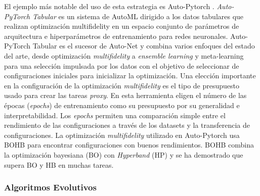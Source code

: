 El ejemplo más notable del uso de esta estrategia es Auto-Pytorch \cite{zimmer2021auto}. \textit{Auto-PyTorch Tabular} es un sistema de AutoML dirigido a los datos tabulares que realizan optimización multifidelity en un espacio conjunto de parámetros de arquitectura e hiperparámetros de entrenamiento para redes neuronales. Auto-PyTorch Tabular es el sucesor de Auto-Net \cite{mendoza2016towards} y combina varios enfoques del estado del arte, desde optimización \textit{multifidelity} a \textit{ensemble learning} y meta-learning para una selección impulsada por los datos con el objetivo de seleccionar de configuraciones iniciales para inicializar la optimización. Una elección importante en la configuración de la optimización \textit{multifidelity} es el tipo de presupuesto usado para crear las tareas \textit{proxy}. En esta herramienta eligen el número de las épocas (\textit{epochs}) de entrenamiento como su presupuesto por su generalidad e interpretabilidad. Los \textit{epochs} permiten una comparación simple entre el rendimiento de las configuraciones a través de los datasets y la transferencia de configuraciones. La optimización \textit{multifidelity} utilizado en Auto-Pytorch usa BOHB \cite{falkner2018bohb} para encontrar configuraciones con buenos rendimientos. BOHB combina la optimización bayesiana (BO) con \textit{Hyperband} (HP) \cite{li2018hyperband} y se ha demostrado que supera BO y HB en muchas tareas.

\subsubsection{Algoritmos Evolutivos}



